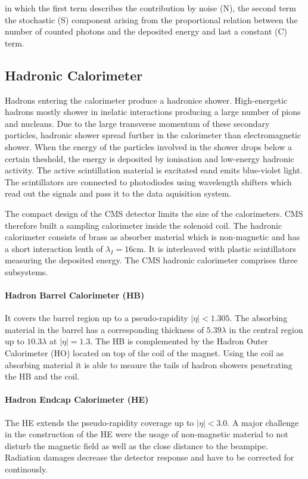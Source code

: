 in which the first term describes the contribution by noise (N), the second
term the stochastic (S) component arising from the proportional relation between
the number of counted photons and the deposited energy and last a constant (C)
term.

\subsection{Hadronic Calorimeter}

Hadrons entering the calorimeter produce a hadronice shower. High-energetic
hadrons mostly shower in inelatic interactions producing a large number of pions
and nucleans. Due to the large transverse momentum of these secondary particles,
hadronic shower spread further in the calorimeter than electromagnetic shower.
When the energy of the particles involved in the shower drops below a certain
theshold, the energy is deposited by ionisation and low-energy hadronic
activity. The active scintillation material is excitated eand emits blue-violet
light. The scintillators are connected to photodiodes using wavelength
shifters which read out the signals and pass it to the data aquisition system.

The compact design of the CMS detector limits the size of the calorimeters. CMS
therefore built a sampling calorimeter inside the solenoid coil. The hadronic
calorimeter consists of brass as absorber material which is non-magnetic and
has a short interaction lenth of $\lambda_I = 16 \si{\centi\metre}$. It is
interleaved with plastic scintillators measuring the deposited energy. The CMS
hadronic calorimeter comprises three subsystems. 
\paragraph{Hadron Barrel Calorimeter (HB)}
It covers the barrel region up to a pseudo-rapidity $|\eta| <
1.305$. The absorbing material in the barrel has a corresponding thickness of
$5.39 \lambda$ in the central region up to $10.3 \lambda$ at $|\eta| = 1.3$. The
HB is complemented by the Hadron Outer Calorimeter (HO) located on top
of the coil of the magnet. Using the coil as absorbing material it is able to
meaure the tails of hadron showers penetrating the HB and the coil.

\paragraph{Hadron Endcap Calorimeter (HE)} The HE extends the pseudo-rapidity
coverage up to $|\eta| < 3.0$. A major challenge in the construction of the HE
were the usage of non-magnetic material to not disturb the magnetic field as
well as the close distance to the beampipe. Radiation damages decrease the
detector response and have to be corrected for continously. 

